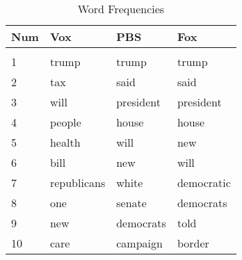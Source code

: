 \begin{table}[H]
    \centering
    \caption{Word Frequencies}
    \label{tab:1gram}
    \begin{tabular}{l|l|l|l} \hline
    \textbf{Num} & \textbf{Vox} & \textbf{PBS} & \textbf{Fox} \\ \hline \hline
    &&& \\
    1   & trump       & trump     & trump      \\
    2   & tax         & said      & said       \\
    3   & will        & president & president  \\
    4   & people      & house     & house      \\
    5   & health      & will      & new        \\
    6   & bill        & new       & will       \\
    7   & republicans & white     & democratic \\
    8   & one         & senate    & democrats  \\
    9   & new         & democrats & told       \\
    10  & care        & campaign  & border     \\ \hline
    \end{tabular}
\end{table}